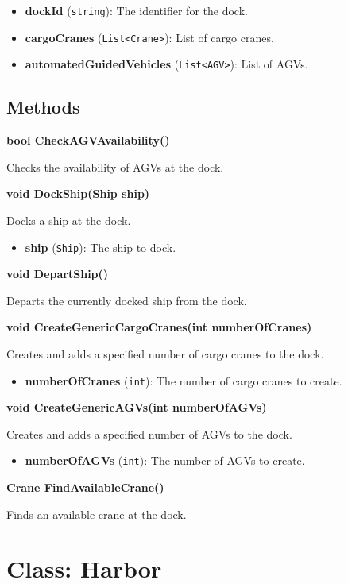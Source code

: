 \documentclass[12pt]{article}
\begin{document}
\begin{itemize}
    \item \textbf{dockId} (\texttt{string}): The identifier for the dock.
    \item \textbf{cargoCranes} (\texttt{List<Crane>}): List of cargo cranes.
    \item \textbf{automatedGuidedVehicles} (\texttt{List<AGV>}): List of AGVs.
\end{itemize}

\subsection*{Methods}

\textbf{bool CheckAGVAvailability()}

Checks the availability of AGVs at the dock.

\textbf{void DockShip(Ship ship)}

Docks a ship at the dock.

\begin{itemize}
    \item \textbf{ship} (\texttt{Ship}): The ship to dock.
\end{itemize}

\textbf{void DepartShip()}

Departs the currently docked ship from the dock.

\textbf{void CreateGenericCargoCranes(int numberOfCranes)}

Creates and adds a specified number of cargo cranes to the dock.

\begin{itemize}
    \item \textbf{numberOfCranes} (\texttt{int}): The number of cargo cranes to create.
\end{itemize}

\textbf{void CreateGenericAGVs(int numberOfAGVs)}

Creates and adds a specified number of AGVs to the dock.

\begin{itemize}
    \item \textbf{numberOfAGVs} (\texttt{int}): The number of AGVs to create.
\end{itemize}

\textbf{Crane FindAvailableCrane()}

Finds an available crane at the dock.

\section*{Class: Harbor}
\end{document}
